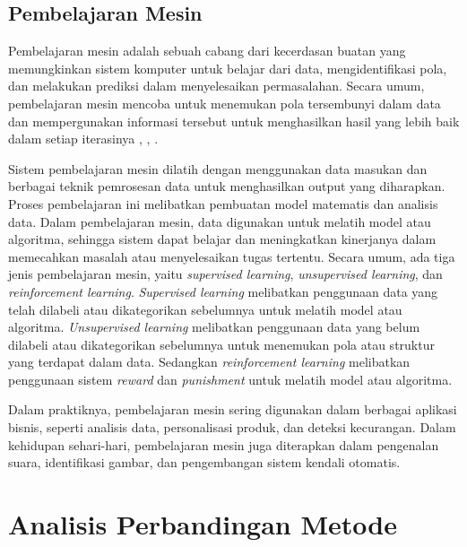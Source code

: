 \subsection{Pembelajaran Mesin}
Pembelajaran mesin adalah sebuah cabang dari kecerdasan buatan yang memungkinkan sistem komputer untuk belajar dari data, mengidentifikasi pola, dan melakukan
prediksi dalam menyelesaikan permasalahan. Secara umum, pembelajaran mesin mencoba untuk menemukan pola tersembunyi dalam data dan mempergunakan informasi
tersebut untuk menghasilkan hasil yang lebih baik dalam setiap iterasinya \cite{jordan2015machine}, \cite{Alpaydin2014}, \cite{murphy2012machine}.

Sistem pembelajaran mesin dilatih dengan menggunakan data masukan dan berbagai teknik pemrosesan data untuk menghasilkan output yang diharapkan. Proses
pembelajaran ini melibatkan pembuatan model matematis dan analisis data. Dalam pembelajaran mesin, data digunakan untuk melatih model atau algoritma, sehingga
sistem dapat belajar dan meningkatkan kinerjanya dalam memecahkan masalah atau menyelesaikan tugas tertentu. Secara umum, ada tiga jenis pembelajaran mesin,
yaitu \emph{supervised learning}, \emph{unsupervised learning}, dan \emph{reinforcement learning}. \emph{Supervised learning} melibatkan penggunaan data yang
telah dilabeli atau dikategorikan sebelumnya untuk melatih model atau algoritma. \emph{Unsupervised learning} melibatkan penggunaan data yang belum dilabeli
atau dikategorikan sebelumnya untuk menemukan pola atau struktur yang terdapat dalam data. Sedangkan \emph{reinforcement learning} melibatkan penggunaan sistem
\emph{reward} dan \emph{punishment} untuk melatih model atau algoritma.

Dalam praktiknya, pembelajaran mesin sering digunakan dalam berbagai aplikasi bisnis, seperti analisis data, personalisasi produk, dan deteksi kecurangan.
Dalam kehidupan sehari-hari, pembelajaran mesin juga diterapkan dalam pengenalan suara, identifikasi gambar, dan pengembangan sistem kendali otomatis.

\section{Analisis Perbandingan Metode}